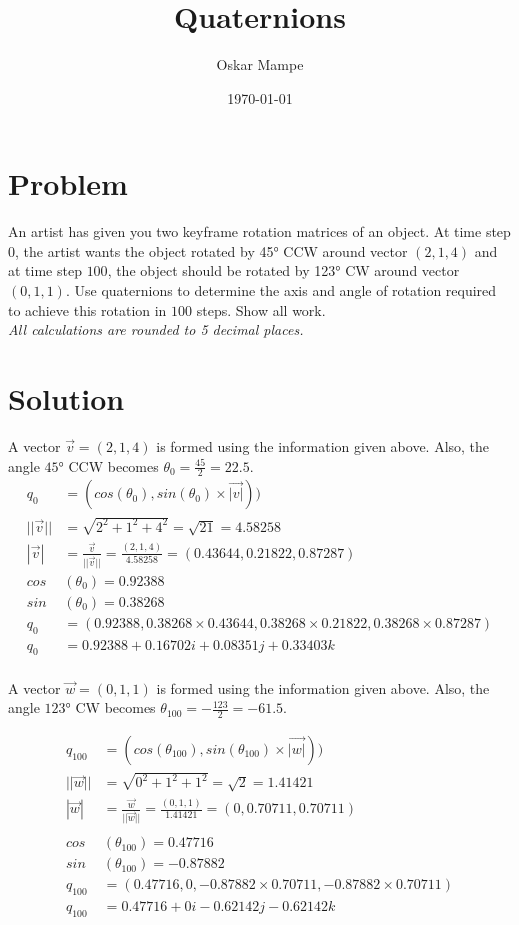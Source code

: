 \documentclass{article}
\author{Oskar Mampe}
\title{Quaternions}
\date{\today}
\begin{document}
\maketitle
\section*{Problem}
An artist has given you two keyframe rotation matrices of an object.  At time step $0$, the artist wants the object rotated by \ang{45} CCW around vector $(2,1,4)$ and at time step $100$, the object should be rotated by \ang{123} CW around vector $(0,1,1)$.
Use quaternions to determine the axis and angle of rotation required to achieve this rotation in $100$ steps.  Show all work.\\[1em]

\textit{All calculations are rounded to 5 decimal places.}

\section*{Solution}



A vector $\vec{v} = (2,1,4)$ is formed using the information given above. Also, the angle $\ang{45}$ CCW becomes $\theta_0 = \frac{45}{2} = 22.5$. 
\begin{align*}
q_0 &= (cos(\theta_0), sin(\theta_0) \times \vec{|v|}))\\[1em]
||\vec{v}|| &= \sqrt{2^2 + 1^ 2 + 4^2}
= \sqrt{21} 
= 4.58258\\[1em]
%
|\vec{v}| &= 
\frac{\vec{v}}{||\vec{v}||} = 
\frac{(2, 1, 4)}{4.58258 }
= (0.43644, 0.21822, 0.87287)\\[1em]
%
cos&(\theta_0) = 0.92388\\[1em]
sin&(\theta_0) = 0.38268\\[1em]
q_0 &= (0.92388,0.38268 \times 0.43644, 0.38268 \times 0.21822, 0.38268 \times 0.87287)\\[1em]
q_0 &= 0.92388 + 0.16702i + 0.08351j + 0.33403k\\[1em]
\end{align*}

A vector $\vec{w} = (0,1,1)$ is formed using the information given above. Also, the angle $\ang{123}$ CW becomes $\theta_{100} = -\frac{123}{2} = -61.5$.

\begin{align*}
q_{100} &= (cos(\theta_{100}), sin(\theta_{100}) \times \vec{|w|}))\\[1em]
||\vec{w}|| &= \sqrt{0^2 + 1^2 + 1^2} = \sqrt{2} = 1.41421\\[1em]
|\vec{w}| &= \frac{\vec{w}}{||\vec{w}||} = \frac{(0,1,1)}{1.41421} = (0, 0.70711, 0.70711)\\[1em]
\\[1em]
cos&(\theta_{100}) = 0.47716\\[1em]
sin&(\theta_{100}) = -0.87882\\[1em]
q_{100} &= (0.47716, 0, -0.87882 \times 0.70711, -0.87882 \times 0.70711)\\[1em]
q_{100} &= 0.47716 + 0i -0.62142j -0.62142k\\[1em]
\end{align*}
\end{document}
